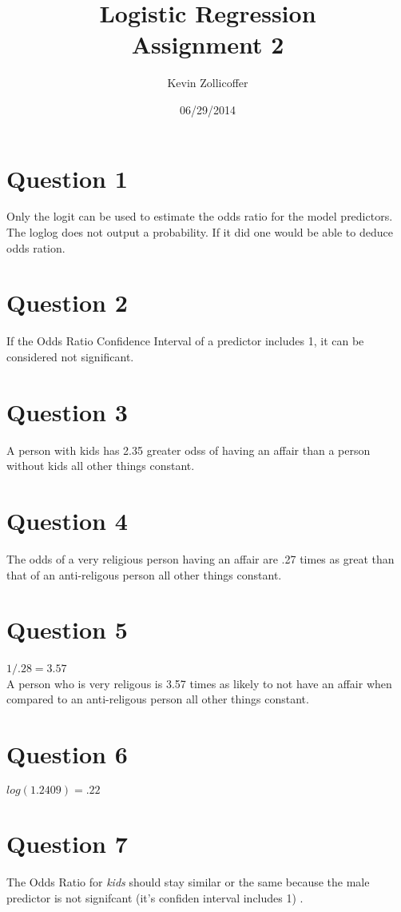 \documentclass{article}
\author{Kevin Zollicoffer}
\title{Logistic Regression\\Assignment 2}
\date{06/29/2014}
\begin{document}
\maketitle


\section*{Question 1}
Only the logit can be used to estimate the odds ratio for the model predictors. The loglog does not output a probability. If it did one would be able to deduce odds ration. 

\section*{Question 2}
If the Odds Ratio Confidence Interval of a predictor includes 1, it can be considered not significant. 

\section*{Question 3}
A person with kids has 2.35 greater odss of having an affair than a person without kids all other things constant. 

\section*{Question 4}
The odds of a very religious person having an affair are .27 times as great than that of an anti-religous person all other things constant. 


\section*{Question 5}
$1/.28 = 3.57$ ~\\

A person who is very religous is 3.57 times as likely to not have an affair when compared to an anti-religous person all other things constant. 

\section*{Question 6}
$log(1.2409) = .22$

\section*{Question 7}
The Odds Ratio for \textit{kids} should stay similar or the same because the male predictor is not signifcant (it's confiden interval includes 1) . 
\end{document}
